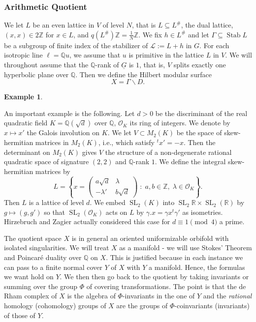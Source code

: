 \documentclass[12pt,leqno]{amsart}
\numberwithin{equation}{section}
\theoremstyle{plain}
\theoremstyle{definition}
\newtheorem{example}[theorem]{Example}
\theoremstyle{remark}
\newcommand{\R}{\mathbb{R}}
\newcommand{\Q}{\mathbb{Q}}
\newcommand{\Z}{\mathbb{Z}}
\newcommand{\G}{\Gamma}
\newcommand{\g}{\gamma}
\newcommand{\back}{\backslash}
\newcommand{\Stab}{\operatorname{Stab}}
\newcommand{\SL}{\operatorname{SL}}
\begin{document}
\subsubsection{Arithmetic Quotient}


We let $L$ be an even lattice in $V$ of level $N$, that is $L \subseteq L^{\#}$, the dual lattice, $(x,x) \in 2 \Z$ for $x \in L$, and $q(L^{\#}) \Z = \tfrac1{N}\Z$. We fix $h \in L^{\#}$ and let $\Gamma \subseteq \Stab{L}$ be a subgroup of finite index of the stabilizer of $\mathcal{L}:=L+h$ in $G$. For each isotropic line $\ell =\Q u$, we assume that $u$ is primitive in the lattice $L$ in $V$. We will throughout assume that the $\Q$-rank of $\underline{G}$ is $1$, that is, $V$ splits exactly one hyperbolic plane over $\Q$. Then we define the Hilbert modular surface
\[
X = \G \back D.
\]

\begin{example}\label{HZex}

An important example is the following. Let $d>0$ be the discriminant of the real quadratic field $K = \Q(\sqrt{d})$ over $\Q$, $\mathcal{O}_K$ its ring of integers. We denote by $x \mapsto x'$
the Galois involution on $K$. We let $V \subset M_2(K)$ be the space
of skew-hermitian matrices in $M_2(K)$, i.e., which satisfy $^tx' =-x$. Then the determinant on $M_2(K)$ gives $V$ the structure of a non-degenerate rational quadratic space of signature $(2,2)$ and $\Q$-rank $1$. We define the integral skew-hermitian matrices by 
\begin{equation*}
L = \left\{ x = \left( \begin{smallmatrix} a\sqrt{d}&\lambda\\-\lambda'&b\sqrt{d}
  \end{smallmatrix}  \right) \; : \; a,b \in \Z, \; \lambda  \in
  \mathcal{O}_K \right\}.
\end{equation*}
 Then $L$ is a lattice of level $d$. We embed $\SL_2(K)$ into $\SL_2{\R} \times \SL_2(\R)$ by $g \mapsto (g,g')$ so that $\SL_2(\mathcal{O}_K)$ acts on $L$ by $\g.x = \g x{^t\g'}$ as isometries. Hirzebruch and Zagier actually considered this case for $d \equiv 1 \pmod{4}$ a prime.
\end{example}

The quotient space $X$ is in general an oriented uniformizable orbifold with isolated singularities.  We will treat $X$ as a manifold - we will use Stokes' Theorem and Poincar\'e duality over $\Q$ on $X$. This is justified because in each instance we can pass to a finite normal cover $Y$ of $X$ with $Y$ a manifold. Hence, the formulas we want hold on $Y$. 
We then then go back to the quotient by taking invariants or summing over the group $\Phi$ of covering transformations. The point is that the de Rham complex of $X$ is the algebra of $\Phi$-invariants in the one of $Y$ and the {\it rational} homology (cohomology) groups of $X$ are the groups of $\Phi$-coinvariants (invariants) of those
 of $Y$. 
\end{document}
